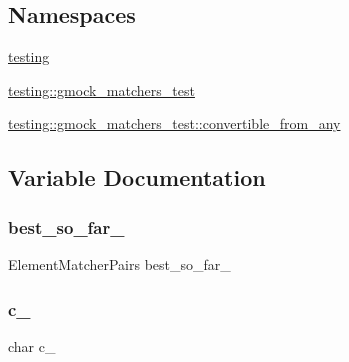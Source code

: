 \subsection*{Namespaces}
\begin{DoxyCompactItemize}
\item 
 \mbox{\hyperlink{namespacetesting}{testing}}
\item 
 \mbox{\hyperlink{namespacetesting_1_1gmock__matchers__test}{testing\+::gmock\+\_\+matchers\+\_\+test}}
\item 
 \mbox{\hyperlink{namespacetesting_1_1gmock__matchers__test_1_1convertible__from__any}{testing\+::gmock\+\_\+matchers\+\_\+test\+::convertible\+\_\+from\+\_\+any}}
\end{DoxyCompactItemize}


\subsection{Variable Documentation}
\mbox{\label{_obj__test_2lib_2googletest-master_2googlemock_2test_2gmock-matchers__test_8cc_af7014f387b012eaf69559acac016b3f4}} 
\subsubsection{\texorpdfstring{best\_so\_far\_}{best\_so\_far\_}}
{\footnotesize\ttfamily Element\+Matcher\+Pairs best\+\_\+so\+\_\+far\+\_\+\hspace{0.3cm}{\ttfamily [private]}}

\mbox{\label{_obj__test_2lib_2googletest-master_2googlemock_2test_2gmock-matchers__test_8cc_a371d6ca064668ac22ed69c7583351ed5}} 
\subsubsection{\texorpdfstring{c\_}{c\_}}
{\footnotesize\ttfamily char c\+\_\+\hspace{0.3cm}{\ttfamily [private]}}

